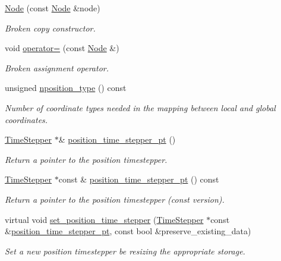 \begin{DoxyCompactItemize}
\hyperlink{classoomph_1_1Node_a86a9dce363f062e0215b63e0b86dec51}{Node} (const \hyperlink{classoomph_1_1Node}{Node} \&node)
\begin{DoxyCompactList}\small\item\em Broken copy constructor. \end{DoxyCompactList}\item 
void \hyperlink{classoomph_1_1Node_a984b28f8b689a85a4060baba377b1c0a}{operator=} (const \hyperlink{classoomph_1_1Node}{Node} \&)
\begin{DoxyCompactList}\small\item\em Broken assignment operator. \end{DoxyCompactList}\item 
unsigned \hyperlink{classoomph_1_1Node_aee6f2b7a46fc9d875c6736895d7fc095}{nposition\+\_\+type} () const
\begin{DoxyCompactList}\small\item\em Number of coordinate types needed in the mapping between local and global coordinates. \end{DoxyCompactList}\item 
\hyperlink{classoomph_1_1TimeStepper}{Time\+Stepper} $\ast$\& \hyperlink{classoomph_1_1Node_a89175b154594ba5b1a6cdde6f385dc71}{position\+\_\+time\+\_\+stepper\+\_\+pt} ()
\begin{DoxyCompactList}\small\item\em Return a pointer to the position timestepper. \end{DoxyCompactList}\item 
\hyperlink{classoomph_1_1TimeStepper}{Time\+Stepper} $\ast$const  \& \hyperlink{classoomph_1_1Node_a5719b9f80b4ca590d2d875dbf83fd342}{position\+\_\+time\+\_\+stepper\+\_\+pt} () const
\begin{DoxyCompactList}\small\item\em Return a pointer to the position timestepper (const version). \end{DoxyCompactList}\item 
virtual void \hyperlink{classoomph_1_1Node_a15d3962d66d92de44e32edc9c5c2fedf}{set\+\_\+position\+\_\+time\+\_\+stepper} (\hyperlink{classoomph_1_1TimeStepper}{Time\+Stepper} $\ast$const \&\hyperlink{classoomph_1_1Node_a89175b154594ba5b1a6cdde6f385dc71}{position\+\_\+time\+\_\+stepper\+\_\+pt}, const bool \&preserve\+\_\+existing\+\_\+data)
\begin{DoxyCompactList}\small\item\em Set a new position timestepper be resizing the appropriate storage. \end{DoxyCompactList}\item 

\end{DoxyCompactItemize}
